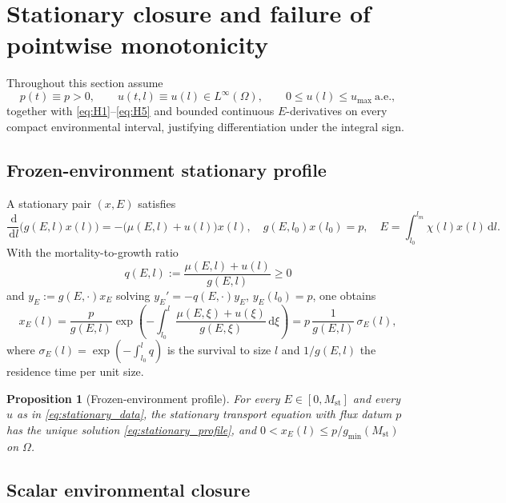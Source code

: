 \documentclass[pdflatex,sn-mathphys-num]{sn-jnl}
\newcommand{\Om}{\Omega}
\newcommand{\dd}{\,\mathrm{d}}
\theoremstyle{plain}
\newtheorem{proposition}[theorem]{Proposition}
\theoremstyle{definition}
\theoremstyle{remark}
\begin{document}
\section{Stationary closure and failure of pointwise monotonicity}
\label{sec:stationary}

Throughout this section assume
\begin{equation}\label{eq:stationary_data}
p(t)\equiv p>0,
\qquad
u(t,l)\equiv u(l)\in L^\infty(\Om),
\qquad
0\le u(l)\le u_{\max}\ \text{a.e.},
\end{equation}
together with \eqref{eq:H1}--\eqref{eq:H5} and bounded continuous $E$-derivatives
on every compact environmental interval, justifying differentiation under the
integral sign.

\subsection{Frozen-environment stationary profile}
\label{subsec:stationary_profile}

A stationary pair $(x,E)$ satisfies
\[
\frac{\dd}{\dd l}\big(g(E,l)x(l)\big)
=
-\big(\mu(E,l)+u(l)\big)x(l),
\quad
g(E,l_0)x(l_0)=p,
\quad
E=\int_{l_0}^{l_m}\chi(l)x(l)\dd l.
\]
With the mortality-to-growth ratio
\[
q(E,l):=\frac{\mu(E,l)+u(l)}{g(E,l)}\ge0
\]
and $y_E:=g(E,\cdot)x_E$ solving $y_E'=-q(E,\cdot)y_E$, $y_E(l_0)=p$, one obtains
\begin{equation}\label{eq:stationary_profile}
x_E(l)
=
\frac{p}{g(E,l)}
\exp\!\left(
-\int_{l_0}^{l}
\frac{\mu(E,\xi)+u(\xi)}{g(E,\xi)}
\dd\xi
\right)
=
p\,\frac{1}{g(E,l)}\,\sigma_E(l),
\end{equation}
where $\sigma_E(l)=\exp(-\int_{l_0}^l q)$ is the survival to size $l$ and
$1/g(E,l)$ the residence time per unit size.

\begin{proposition}[Frozen-environment profile]
\label{prop:frozen_stationary_profile}
For every $E\in[0,M_{\mathrm{st}}]$ and every $u$ as in
\eqref{eq:stationary_data}, the stationary transport equation with flux datum $p$
has the unique solution \eqref{eq:stationary_profile}, and
$0<x_E(l)\le p/g_{\min}(M_{\mathrm{st}})$ on $\Om$.
\end{proposition}

\subsection{Scalar environmental closure}
\label{subsec:scalar_closure}
\end{document}
